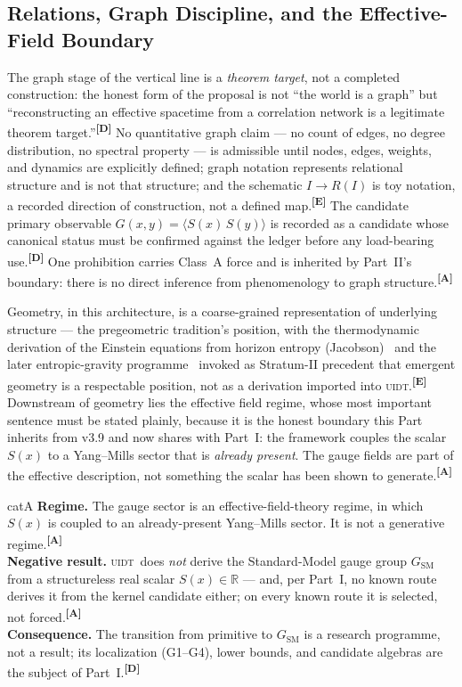 \documentclass[12pt,a4paper,twoside]{article}
\theoremstyle{plain}
\theoremstyle{definition}
\theoremstyle{remark}
\newcommand{\UIDT}{\textsc{uidt}} %
\newcommand{\catmark}[1]{\textsuperscript{\textsf{\textbf{[#1]}}}}
\begin{document}
\subsection{Relations, Graph Discipline, and the Effective-Field Boundary}
\label{subsec:coarse-geometry-eft}

The graph stage of the vertical line is a \emph{theorem target}, not a
completed construction: the honest form of the proposal is not ``the
world is a graph'' but ``reconstructing an effective spacetime from a
correlation network is a legitimate theorem target.''\catmark{D} No
quantitative graph claim --- no count of edges, no degree distribution,
no spectral property --- is admissible until nodes, edges, weights, and
dynamics are explicitly defined; graph notation represents relational
structure and is not that structure; and the schematic $I \to R(I)$ is
toy notation, a recorded direction of construction, not a defined
map.\catmark{E} The candidate primary observable
$G(x,y) = \langle S(x)\,S(y)\rangle$ is recorded as a candidate whose
canonical status must be confirmed against the ledger before any
load-bearing use.\catmark{D} One prohibition carries Class~A force and
is inherited by Part~II's boundary: there is no direct inference from
phenomenology to graph structure.\catmark{A}

Geometry, in this architecture, is a coarse-grained representation of
underlying structure --- the pregeometric tradition's position, with the
thermodynamic derivation of the Einstein equations from horizon entropy
(Jacobson)~\cite{jacobson1995} and the later entropic-gravity programme~\cite{padmanabhan2010,verlinde2011,chirco2014} invoked as
Stratum-II precedent that emergent geometry is a respectable position,
not as a derivation imported into \UIDT.\catmark{E} Downstream of
geometry lies the effective field regime, whose most important sentence
must be stated plainly, because it is the honest boundary this Part
inherits from v3.9 and now shares with Part~I: the framework couples the
scalar $S(x)$ to a Yang--Mills sector that is \emph{already present}.
The gauge fields are part of the effective description, not something
the scalar has been shown to generate.\catmark{A}

\begin{evidencebox}{catA}
\textbf{Regime.} The gauge sector is an effective-field-theory regime,
in which $S(x)$ is coupled to an already-present Yang--Mills sector. It
is not a generative regime.\catmark{A}\\[0.3em]
\textbf{Negative result.} \UIDT\ does \emph{not} derive the
Standard-Model gauge group $G_{\mathrm{SM}}$ from a structureless real
scalar $S(x)\in\mathbb{R}$ --- and, per Part~I, no known route derives
it from the kernel candidate either; on every known route it is
selected, not forced.\catmark{A}\\[0.3em]
\textbf{Consequence.} The transition from primitive to
$G_{\mathrm{SM}}$ is a research programme, not a result; its
localization (G1--G4), lower bounds, and candidate algebras are the
subject of Part~I.\catmark{D}
\end{evidencebox}
\end{document}

